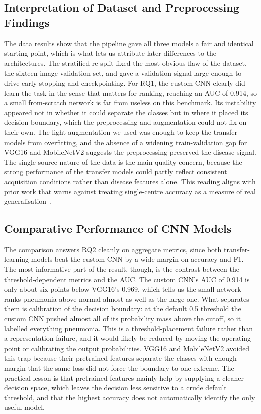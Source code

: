 \documentclass[preprint,12pt]{elsarticle}
\begin{document}
\subsection{Interpretation of Dataset and Preprocessing Findings}
The data results show that the pipeline gave all three models a fair and identical starting point, which is what lets us attribute later differences to the architectures.
The stratified re-split fixed the most obvious flaw of the dataset, the sixteen-image validation set, and gave a validation signal large enough to drive early stopping and checkpointing.
For RQ1, the custom CNN clearly did learn the task in the sense that matters for ranking, reaching an AUC of 0.914, so a small from-scratch network is far from useless on this benchmark.
Its instability appeared not in whether it could separate the classes but in where it placed its decision boundary, which the preprocessing and augmentation could not fix on their own.
The light augmentation we used was enough to keep the transfer models from overfitting, and the absence of a widening train-validation gap for VGG16 and MobileNetV2 suggests the preprocessing preserved the disease signal.
The single-source nature of the data is the main quality concern, because the strong performance of the transfer models could partly reflect consistent acquisition conditions rather than disease features alone.
This reading aligns with prior work that warns against treating single-centre accuracy as a measure of real generalisation~\cite{aitnasser2023review}.

\subsection{Comparative Performance of CNN Models}
The comparison answers RQ2 cleanly on aggregate metrics, since both transfer-learning models beat the custom CNN by a wide margin on accuracy and F1.
The most informative part of the result, though, is the contrast between the threshold-dependent metrics and the AUC.
The custom CNN's AUC of 0.914 is only about six points below VGG16's 0.969, which tells us the small network ranks pneumonia above normal almost as well as the large one.
What separates them is calibration of the decision boundary: at the default 0.5 threshold the custom CNN pushed almost all of its probability mass above the cutoff, so it labelled everything pneumonia.
This is a threshold-placement failure rather than a representation failure, and it would likely be reduced by moving the operating point or calibrating the output probabilities.
VGG16 and MobileNetV2 avoided this trap because their pretrained features separate the classes with enough margin that the same loss did not force the boundary to one extreme.
The practical lesson is that pretrained features mainly help by supplying a cleaner decision space, which leaves the decision less sensitive to a crude default threshold, and that the highest accuracy does not automatically identify the only useful model.
\end{document}
